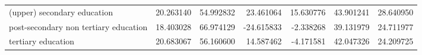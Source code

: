 \documentclass{article}
\begin{document}
\begin{table}[!htbp]
\begin{center}
{\begin{tabular}{lrrrrrr}
(upper) secondary education           &  20.263140 &  54.992832 &  23.461064 &  15.630776 &  43.901241 &  28.640950 \\
post-secondary non tertiary education &  18.403028 &  66.974129 & -24.615833 &  -2.338268 &  39.131979 &  24.711977 \\
tertiary education                    &  20.683067 &  56.160600 &  14.587462 &  -4.171581 &  42.047326 &  24.209725 \\
\bottomrule
\end{tabular}

}
\end{center}
\end{table}
\end{document}
